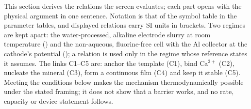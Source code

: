 \providecommand{\thsiNum}[1]{\ifdefined\nacrePending\nacrePending{macro #1}\else\texttt{[#1]}\fi}
\providecommand{\NumPcred}{\thsiNum{NumPcred}}
\providecommand{\NumPcredSweepLow}{\thsiNum{NumPcredSweepLow}}
\providecommand{\NumPcredSweepHigh}{\thsiNum{NumPcredSweepHigh}}
\providecommand{\NumMexpt}{\thsiNum{NumMexpt}}
\providecommand{\NumMwindow}{\thsiNum{NumMwindow}}
\providecommand{\Apatch}{A_\mathrm{patch}}
\providecommand{\Nreq}{N_\mathrm{req}}
\providecommand{\Nnuc}{N_\mathrm{nuc}}
\providecommand{\mexpt}{m_\mathrm{expt}}
\providecommand{\Ecmax}{E_\mathrm{cell}^{\max}}
\providecommand{\Ecmin}{E_\mathrm{cell}^{\min}}

This section derives the relations the screen evaluates; each part opens with the physical argument in one sentence. Notation is that of the symbol table in the parameter tables, and displayed
relations carry SI units in brackets. Two regimes are kept apart: the water-processed, alkaline
electrode slurry at room temperature (\Rs) and the non-aqueous, fluorine-free cell with the Al collector
at the cathode's potential (\Rc); a relation is used only in the regime whose reference states it
assumes. The links C1--C5 are: anchor the template (C1), bind Ca$^{2+}$ (C2), nucleate the mineral
(C3), form a continuous film (C4) and keep it stable (C5). Meeting the conditions below makes the
mechanism thermodynamically possible under the stated framing; it does not show that a barrier works, and
no rate, capacity or device statement follows.


